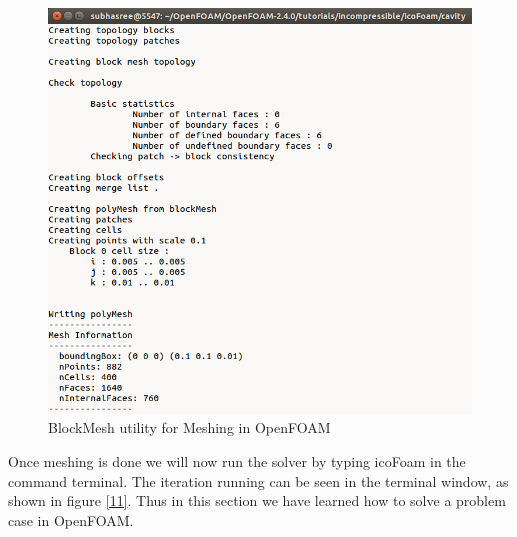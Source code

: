 \documentclass[a4paper,12pt]{report}
\begin{document}
  \begin{figure}[ht]  
\begin{center}  
\includegraphics[scale=0.3]{10.png}
\caption{BlockMesh utility for Meshing in OpenFOAM}
\label{10}
\end{center}  
\end{figure}
\vspace{10cm}
\flushleft Once meshing is done we will now run the solver by typing icoFoam in the command terminal. The iteration running can be seen in the terminal window, as shown in figure \ref{11}. Thus in this section we have learned how to solve a problem case in OpenFOAM. 
\end{document}
